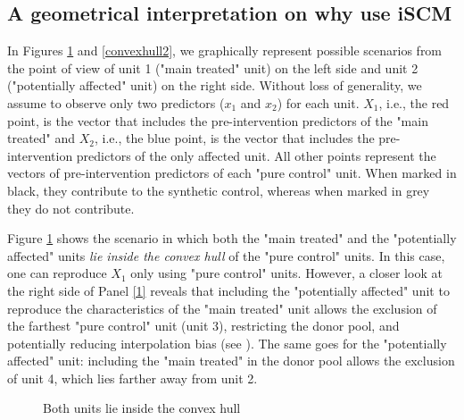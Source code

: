 \subsection{A geometrical interpretation on why use iSCM}\label{why}
In Figures \ref{convexhull1} and \ref{convexhull2}, we graphically represent possible scenarios from the point of view of unit 1 ("main treated" unit) on the left side and unit 2 ("potentially affected" unit) on the right side. Without loss of generality, we assume to observe only two predictors ($x_1$ and $x_2$) for each unit. $X_1$, i.e., the red point, is the vector that includes the pre-intervention predictors of the "main treated" and $X_2$, i.e., the blue point, is the vector that includes the pre-intervention predictors of the only affected unit. All other points represent the vectors of pre-intervention predictors of each "pure control" unit. When marked in black, they contribute to the synthetic control, whereas when marked in grey they do not contribute. 

Figure \ref{convexhull1} shows the scenario in which both the "main treated" and the "potentially affected" units \textit{lie inside the convex hull} of the "pure control" units. In this case, one can reproduce $X_1$ only using "pure control" units. However, a closer look at the right side of Panel \ref{1} reveals that including the "potentially affected" unit to reproduce the characteristics of the "main treated" unit allows the exclusion of the farthest "pure control" unit (unit 3), restricting the donor pool, and potentially reducing interpolation bias (see \citealt{Aba2020}). 
The same goes for the "potentially affected" unit: including the "main treated" in the donor pool allows the exclusion of unit 4, which lies farther away from unit 2.

\begin{figure}[H]
\centering
{}
\quad
\caption{Both units lie inside the convex hull}
\label{convexhull1}
\end{figure}

